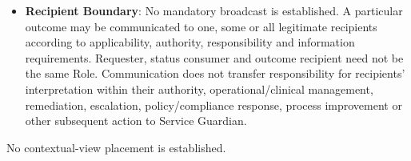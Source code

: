 \begin{itemize}
\item
\textbf{Recipient Boundary}: No mandatory broadcast is established. A particular outcome may be communicated to one, some or all legitimate recipients according to applicability, authority, responsibility and information requirements. Requester, status consumer and outcome recipient need not be the same Role. Communication does not transfer responsibility for recipients' interpretation within their authority, operational/\allowbreak{}clinical management, remediation, escalation, policy/\allowbreak{}compliance response, process improvement or other subsequent action to Service Guardian.



\end{itemize}


No contextual-view placement is established.


